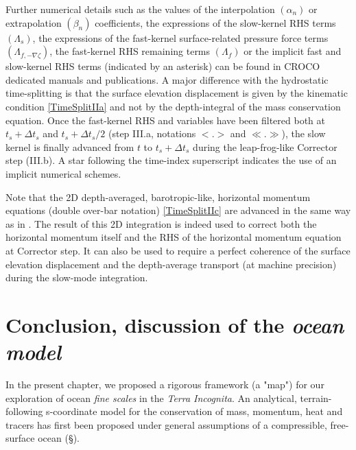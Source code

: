 Further numerical details such as the values of the interpolation $(\alpha_n)$ or extrapolation $(\beta_n)$ coefficients, the expressions of the slow-kernel RHS terms $(\Lambda_s)$, the expressions of the fast-kernel surface-related pressure force terms $(\Lambda_{f,-\nabla\zeta})$,  the fast-kernel RHS remaining terms $(\Lambda_{f})$ or the implicit fast and slow-kernel RHS terms (indicated by an asterisk) can be found in CROCO dedicated manuals and publications. 
A major difference with the hydrostatic time-splitting is that the surface elevation displacement is given by the kinematic condition \ref{TimeSplitIIa} and not by the depth-integral of the mass conservation equation. Once the fast-kernel RHS and variables have been filtered both at $t_s+\Delta t_s$ and $t_s+\Delta t_s/2$ (step III.a, notations $<.>$ and $\ll.\gg$), the slow kernel is finally advanced from $t$ to  $t_s+\Delta t_s$ during the leap-frog-like Corrector step (III.b). A star following the time-index superscript indicates the use of an implicit numerical schemes.

Note that the 2D depth-averaged, barotropic-like, horizontal momentum equations (double over-bar notation) \ref{TimeSplitIIc} are advanced in the same way as in \cite{shchepetkin_regional_2005}. The result of this 2D integration is indeed used to correct both the horizontal momentum itself and the RHS of the horizontal momentum equation at Corrector step. It can also be used to require a perfect coherence of the surface elevation displacement and the depth-average transport (at machine precision) during the slow-mode integration.


\section{Conclusion, discussion of the \textit{ocean model}}
In the present chapter, we proposed a rigorous framework (a "map") for our exploration of ocean \textit{fine scales} in the \textit{Terra Incognita}. An analytical, terrain-following s-coordinate model for the conservation of mass, momentum, heat and tracers has first been proposed under general assumptions of a compressible, free-surface ocean (\S {}). 

